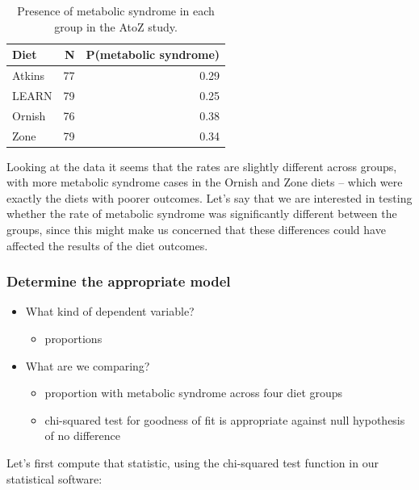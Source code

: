 \documentclass[
  12pt,
]{book}
\providecommand{\tightlist}{%
  \setlength{\itemsep}{0pt}\setlength{\parskip}{0pt}}
\begin{document}
\begin{table}

\caption{\label{tab:metsymData}Presence of metabolic syndrome in each group in the AtoZ study.}
\centering
\begin{tabular}[t]{l|r|r}
\hline
Diet & N & P(metabolic syndrome)\\
\hline
Atkins & 77 & 0.29\\
\hline
LEARN & 79 & 0.25\\
\hline
Ornish & 76 & 0.38\\
\hline
Zone & 79 & 0.34\\
\hline
\end{tabular}
\end{table}

Looking at the data it seems that the rates are slightly different across groups, with more metabolic syndrome cases in the Ornish and Zone diets -- which were exactly the diets with poorer outcomes. Let's say that we are interested in testing whether the rate of metabolic syndrome was significantly different between the groups, since this might make us concerned that these differences could have affected the results of the diet outcomes.

\hypertarget{determine-the-appropriate-model-1}{%
\subsubsection{Determine the appropriate model}\label{determine-the-appropriate-model-1}}

\begin{itemize}
\tightlist
\item
  What kind of dependent variable?

  \begin{itemize}
  \tightlist
  \item
    proportions
  \end{itemize}
\item
  What are we comparing?

  \begin{itemize}
  \tightlist
  \item
    proportion with metabolic syndrome across four diet groups
  \item
    chi-squared test for goodness of fit is appropriate against null hypothesis of no difference
  \end{itemize}
\end{itemize}

Let's first compute that statistic, using the chi-squared test function in our statistical software:
\end{document}
